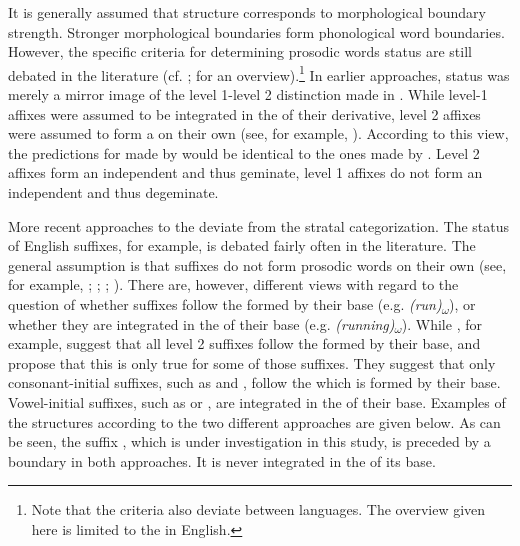 It is generally assumed that  structure corresponds to morphological boundary strength. Stronger morphological boundaries form phonological word boundaries. However, the specific criteria for determining prosodic words status are still debated in the literature (cf. \citealt{Raffelsiefen.1999}; \citealt{Hall.2001} for an overview).\footnote{Note that the criteria also deviate between languages. The overview given here is limited to the  in English.} 
In earlier approaches,  status was merely a mirror image of the level 1-level 2 distinction made in . While level-1 affixes were assumed to be integrated in the  of their derivative, level 2 affixes were assumed to form a  on their own (see, for example, \citealt{Aronoff.1983,Booij.1983b,Szpyra.1989}). According to this view, the predictions for  made by  would be identical to the ones made by . Level 2 affixes form an independent  and thus geminate, level 1 affixes do not form an independent  and thus degeminate. 

More recent approaches to the  deviate from the stratal categorization. The  status of English suffixes, for example, is debated fairly often in the literature. The general assumption is that suffixes do not form prosodic words on their own (see, for example, \citealt[311]{Wennerstrom.1993}; \citealt[184]{Raffelsiefen.1999}; \citealt[401]{Hall.2001b}; \citealt{Sugahara.2009}). There are, however, different views with regard to the question of whether suffixes follow the  formed by their base (e.g. \textit{(run)\textsubscript{$\omega$}}), or whether they are integrated in the  of their base (e.g. \textit{(running)\textsubscript{$\omega$}}). While \cite{Sugahara.2009}, for example, suggest that all level 2 suffixes follow the  formed by their base, \cite{Raffelsiefen.1999} and \cite{Hall.2001b} propose that this is only true for some of those suffixes. They suggest that only consonant-initial suffixes, such as  and , follow the  which is formed by their base. Vowel-initial suffixes, such as  or , are integrated in the  of their base. Examples of the  structures according to the two different approaches are given below. As can be seen, the suffix , which is under investigation in this study, is preceded by a  boundary in both approaches. It is never integrated in the  of its base.


